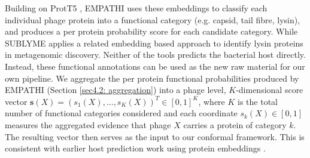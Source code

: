  
Building on ProtT5 \cite{elnaggar2022prottrans}, EMPATHI \cite{boulay2025empathi} uses these embeddings to classify each 
individual phage protein into a functional category (e.g. capsid, tail fibre, lysin), and produces a per protein probability 
score for each candidate category. While SUBLYME \cite{boulay2026phalp} applies a related embedding based approach 
to identify lysin proteins in metagenomic discovery. Neither of the tools predicts the bacterial host directly. Instead, 
these functional annotations can be used as the new raw material for our own pipeline. We aggregate the per protein functional 
probabilities produced by EMPATHI (Section \ref{sec4.2: aggregation}) into a phage level, $K$-dimensional score vector
$\mathbf{s}(X) = (s_1(X), ..., s_K(X))^T \in [0,1]^K$, where $K$ is the total number of functional categories considered and
each coordinate $s_k(X) \in [0,1]$ measures the aggregated evidence that phage $X$ carries a protein of category $k$. The resulting 
vector then serves as the input to our
conformal framework. This is consistent with earlier host prediction work using protein embeddings \cite{gonzales2023protein,du2026high}. 
